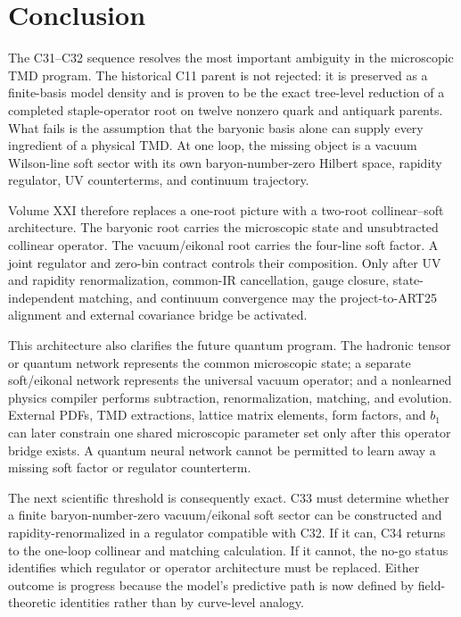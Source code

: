 \documentclass[11pt]{article}
\begin{document}
\section{Conclusion}
\label{sec:conclusion}

The C31--C32 sequence resolves the most important ambiguity in the microscopic TMD program.  The historical C11 parent is not rejected: it is preserved as a finite-basis model density and is proven to be the exact tree-level reduction of a completed staple-operator root on twelve nonzero quark and antiquark parents.  What fails is the assumption that the baryonic basis alone can supply every ingredient of a physical TMD.  At one loop, the missing object is a vacuum Wilson-line soft sector with its own baryon-number-zero Hilbert space, rapidity regulator, UV counterterms, and continuum trajectory.

Volume XXI therefore replaces a one-root picture with a two-root collinear--soft architecture.  The baryonic root carries the microscopic state and unsubtracted collinear operator.  The vacuum/eikonal root carries the four-line soft factor.  A joint regulator and zero-bin contract controls their composition.  Only after UV and rapidity renormalization, common-IR cancellation, gauge closure, state-independent matching, and continuum convergence may the project-to-ART25 alignment and external covariance bridge be activated.

This architecture also clarifies the future quantum program.  The hadronic tensor or quantum network represents the common microscopic state; a separate soft/eikonal network represents the universal vacuum operator; and a nonlearned physics compiler performs subtraction, renormalization, matching, and evolution.  External PDFs, TMD extractions, lattice matrix elements, form factors, and \(b_1\) can later constrain one shared microscopic parameter set only after this operator bridge exists.  A quantum neural network cannot be permitted to learn away a missing soft factor or regulator counterterm.

The next scientific threshold is consequently exact.  C33 must determine whether a finite baryon-number-zero vacuum/eikonal soft sector can be constructed and rapidity-renormalized in a regulator compatible with C32.  If it can, C34 returns to the one-loop collinear and matching calculation.  If it cannot, the no-go status identifies which regulator or operator architecture must be replaced.  Either outcome is progress because the model's predictive path is now defined by field-theoretic identities rather than by curve-level analogy.
\end{document}
